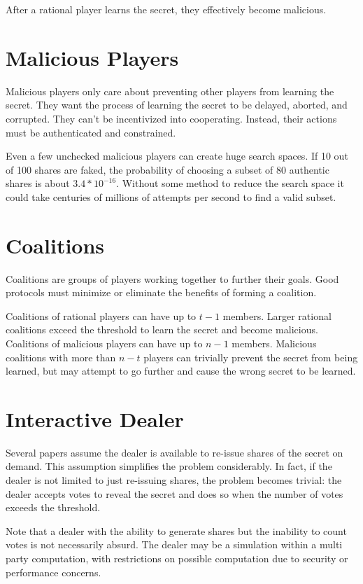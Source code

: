 \documentclass{dalcsthesis}
\begin{document}
After a rational player learns the secret, they effectively become malicious.

\section{Malicious Players}

Malicious players only care about preventing other players from learning the secret. They want the process of learning the secret to be delayed, aborted, and corrupted. They can't be incentivized into cooperating. Instead, their actions must be authenticated and constrained.

Even a few unchecked malicious players can create huge search spaces. If 10 out of 100 shares are faked, the probability of choosing a subset of 80 authentic shares is about $3.4 * 10^{-16}$. Without some method to reduce the search space it could take centuries of millions of attempts per second to find a valid subset.

\section{Coalitions}

Coalitions are groups of players working together to further their goals. Good protocols must minimize or eliminate the benefits of forming a coalition.

Coalitions of rational players can have up to $t-1$ members. Larger rational coalitions exceed the threshold to learn the secret and become malicious. Coalitions of malicious players can have up to $n-1$ members. Malicious coalitions with more than $n-t$ players can trivially prevent the secret from being learned, but may attempt to go further and cause the wrong secret to be learned.

\section{Interactive Dealer}

Several papers assume the dealer is available to re-issue shares of the secret on demand. This assumption simplifies the problem considerably. In fact, if the dealer is not limited to just re-issuing shares, the problem becomes trivial: the dealer accepts votes to reveal the secret and does so when the number of votes exceeds the threshold.

Note that a dealer with the ability to generate shares but the inability to count votes is not necessarily absurd. The dealer may be a simulation within a multi party computation, with restrictions on possible computation due to security or performance concerns.
\end{document}

